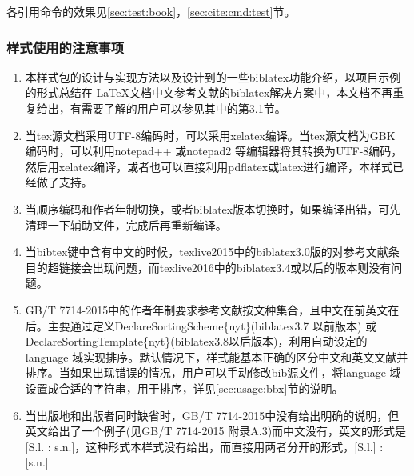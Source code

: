 各引用命令的效果见\ref{sec:test:book}，\ref{sec:cite:cmd:test}节。

\subsubsection{样式使用的注意事项}

\begin{enumerate}
  \item 本样式包的设计与实现方法以及设计到的一些biblatex功能介绍，以项目示例的形式总结在
  \href{https://github.com/hushidong/biblatex-solution-to-latex-bibliography}{\LaTeX 文档中文参考文献的biblatex解决方案}中，本文档不再重复给出，有需要了解的用户可以参见其中的第3.1节。

  \item 当tex源文档采用UTF-8编码时，可以采用xelatex编译。当tex源文档为GBK 编码时，可以利用notepad++ 或notepad2 等编辑器将其转换为UTF-8编码，然后用xelatex编译，或者也可以直接利用pdflatex或latex进行编译，本样式已经做了支持。

  \item 当顺序编码和作者年制切换，或者biblatex版本切换时，如果编译出错，可先清理一下辅助文件，完成后再重新编译。

  \item 当bibtex键中含有中文的时候，texlive2015中的biblatex3.0版的对参考文献条目的超链接会出现问题，而texlive2016中的biblatex3.4或以后的版本则没有问题。

  \item GB/T 7714-2015中的作者年制要求参考文献按文种集合，且中文在前英文在后。主要通过定义DeclareSortingScheme\{nyt\}(biblatex3.7 以前版本) 或DeclareSortingTemplate\{nyt\}(biblatex3.8以后版本)，利用自动设定的language 域实现排序。默认情况下，样式能基本正确的区分中文和英文文献并排序。当如果出现错误的情况，用户可以手动修改bib源文件，将language 域设置成合适的字符串，用于排序，详见\ref{sec:usage:bbx}节的说明。


  \item 当出版地和出版者同时缺省时，GB/T 7714-2015中没有给出明确的说明，但英文给出了一个例子(见GB/T 7714-2015 附录A.3)而中文没有，英文的形式是[S.l. : s.n.]，这种形式本样式没有给出，而直接用两者分开的形式，[S.l.] : [s.n.]


\end{enumerate}
